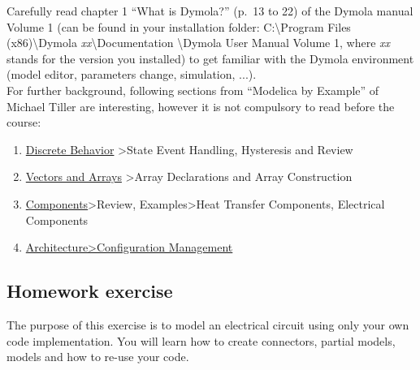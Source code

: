 \documentclass[10pt,a4paper]{article}
\begin{document}
Carefully read chapter 1 ``What is Dymola?'' (p.~13 to 22) of the Dymola manual 
Volume 1 (can be found in your installation folder: C:\textbackslash Program 
Files (x86)\textbackslash Dymola \textit{xx}\textbackslash Documentation 
\textbackslash Dymola User Manual Volume 1, where \textit{xx} stands for the 
version you installed) to get familiar with the Dymola environment (model 
editor, parameters change, simulation, ...).\\

For further background, following sections from ``Modelica by Example'' of 
Michael Tiller are interesting, however it is not compulsory to read before the 
course: 
\begin{enumerate}
\item \href{http://book.xogeny.com/behavior/discrete/}{Discrete Behavior} >State Event Handling, Hysteresis and Review
\item	\href{http://book.xogeny.com/behavior/arrays/}{Vectors and Arrays} >Array Declarations and Array Construction
\item	\href{http://book.xogeny.com/components/components/#review}{Components}>Review, Examples>Heat Transfer Components, Electrical Components
\item \href{http://book.xogeny.com/components/architectures/replaceable/}{Architecture>Configuration Management}
		
\end{enumerate}

\subsection*{Homework exercise}
The purpose of this exercise is to model an electrical circuit using only your own code implementation. You will learn how to create connectors, partial models, models and how to re-use your code.
\end{document}
